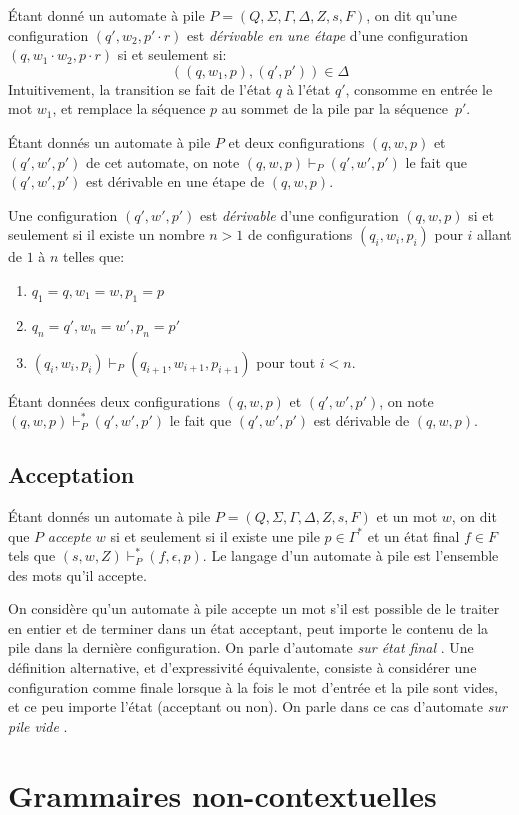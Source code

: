 Étant donné un automate à pile $P = (Q, \Sigma, \Gamma, \Delta, Z, s, F)$, on dit qu'une configuration $(q', w_2, p' \cdot r)$ est \og \textit{dérivable en une étape} \fg{} d'une configuration $(q, w_1 \cdot w_2, p \cdot r)$ si et seulement si:
\[
((q, w_1, p), (q', p')) \in \Delta
\]
Intuitivement, la transition se fait de l'état $q$ à l'état $q'$, consomme en entrée le mot $w_1$, et remplace la séquence $p$ au sommet de la pile par la séquence~$p'$.

Étant donnés un automate à pile $P$ et deux configurations $(q, w, p)$ et $(q', w', p')$ de cet automate, on note $(q, w, p) \vdash_P (q', w', p')$ le fait que $(q', w', p')$ est dérivable en une étape de $(q, w, p)$.

Une configuration $(q', w', p')$ est \og \textit{dérivable} \fg{} d'une configuration $(q, w, p)$ si et seulement si il existe un nombre $n > 1$ de configurations $(q_i, w_i, p_i)$ pour $i$ allant de $1$ à $n$ telles que:
\begin{enumerate}
\item $q_1 = q, w_1 = w, p_1 = p$
\item $q_n = q', w_n = w', p_n = p'$
\item $(q_i, w_i, p_i) \vdash_P (q_{i+1}, w_{i+1}, p_{i+1})$ pour tout $i < n$.
\end{enumerate}
Étant données deux configurations $(q, w, p)$ et $(q', w', p')$, on note $(q, w, p) \vdash_P^* (q', w', p')$ le fait que $(q', w', p')$ est dérivable de $(q, w, p)$.

\subsection{Acceptation}

Étant donnés un automate à pile $P = (Q, \Sigma, \Gamma, \Delta, Z, s, F)$ et un mot $w$, on dit que $P$ \og \textit{accepte} \fg{} $w$ si et seulement si il existe une pile $p \in \Gamma^*$ et un état final $f \in F$ tels que $(s, w, Z) \vdash_P^* (f, \epsilon, p)$.
Le langage d'un automate à pile est l'ensemble des mots qu'il accepte.

On considère qu'un automate à pile accepte un mot s'il est possible de le traiter en entier et de terminer dans un état acceptant, peut importe le contenu de la pile dans la dernière configuration.
On parle d'automate \og \textit{sur état final} \fg{}. Une définition alternative, et d'expressivité équivalente, consiste à considérer une configuration comme finale lorsque à la fois le mot d'entrée et la pile sont vides, et ce peu importe l'état (acceptant ou non).
On parle dans ce cas d'automate \og \textit{sur pile vide} \fg{}.


\section{Grammaires non-contextuelles}
